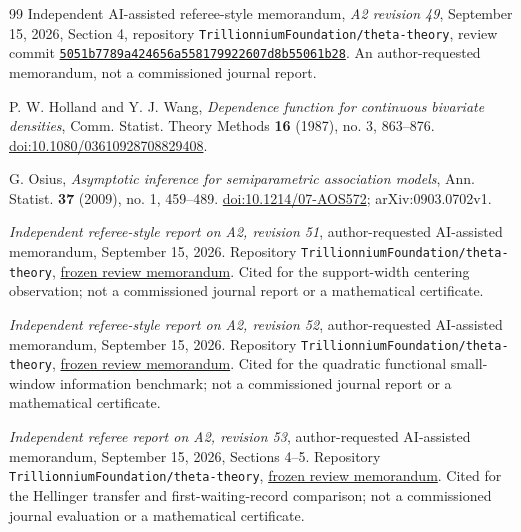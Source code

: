 \begin{thebibliography}{99}
Independent AI-assisted referee-style memorandum,
\emph{A2 revision 49}, September 15, 2026, Section 4,
repository \texttt{Trillionnium\allowbreak Foundation/\allowbreak theta-theory},
review commit
\href{https://github.com/TrillionniumFoundation/theta-theory/commit/5051b7789a424656a558179922607d8b55061b28}{\texttt{5051b778\allowbreak 9a424656\allowbreak a5581799\allowbreak 22607d8b\allowbreak 55061b28}}.
An author-requested memorandum, not a commissioned journal report.


P. W. Holland and Y. J. Wang, \emph{Dependence function for continuous
bivariate densities}, Comm. Statist. Theory Methods \textbf{16} (1987),
no. 3, 863--876. \href{https://doi.org/10.1080/03610928708829408}{doi:10.1080/03610928708829408}.

G. Osius, \emph{Asymptotic inference for semiparametric association models},
Ann. Statist. \textbf{37} (2009), no. 1, 459--489.
\href{https://doi.org/10.1214/07-AOS572}{doi:10.1214/07-AOS572}; arXiv:0903.0702v1.


\emph{Independent referee-style report on A2, revision 51},
author-requested AI-assisted memorandum, September 15, 2026.
Repository \texttt{TrillionniumFoundation/theta-theory},
\href{https://github.com/TrillionniumFoundation/theta-theory/blob/d0fd9a9b0d5cdd8004f42a7f109e39de50adda75/reviews/a2-v51-independent-harsh-top4-2026-09-15/REFEREE_REPORT.md}{frozen review memorandum}.
Cited for the support-width centering observation; not a commissioned
journal report or a mathematical certificate.


\emph{Independent referee-style report on A2, revision 52},
author-requested AI-assisted memorandum, September 15, 2026.
Repository \texttt{TrillionniumFoundation/theta-theory},
\href{https://github.com/TrillionniumFoundation/theta-theory/blob/28873f43ff25b2052afcce4df8c68907517e8b14/reviews/a2-v52-independent-harsh-top4-2026-09-15/REFEREE_REPORT.md}{frozen review memorandum}.
Cited for the quadratic functional small-window information benchmark;
not a commissioned journal report or a mathematical certificate.

\emph{Independent referee report on A2, revision 53},
author-requested AI-assisted memorandum, September 15, 2026, Sections 4--5.
Repository \texttt{TrillionniumFoundation/theta-theory},
\href{https://github.com/TrillionniumFoundation/theta-theory/blob/000ce24f65f8381d2180cbd1f080d3d8470c8157/reviews/a2-v53-independent-harsh-top4-2026-09-15/REFEREE_REPORT.md}{frozen review memorandum}.
Cited for the Hellinger transfer and first-waiting-record comparison;
not a commissioned journal evaluation or a mathematical certificate.



\end{thebibliography}
